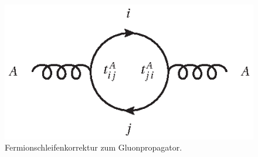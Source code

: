 \begin{figure}[h]
 \centering
 \includegraphics{abschnitte/n-schleifen/fig/QCD3.eps}
 \caption{Fermionschleifenkorrektur zum Gluonpropagator.}\label{fig:n-schleifen:QCD3}
\end{figure}
